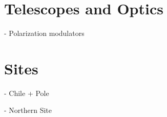 \section{Telescopes and Optics}

     - Polarization modulators

\section{Sites}

     - Chile + Pole

     - Northern Site
     
     
%



